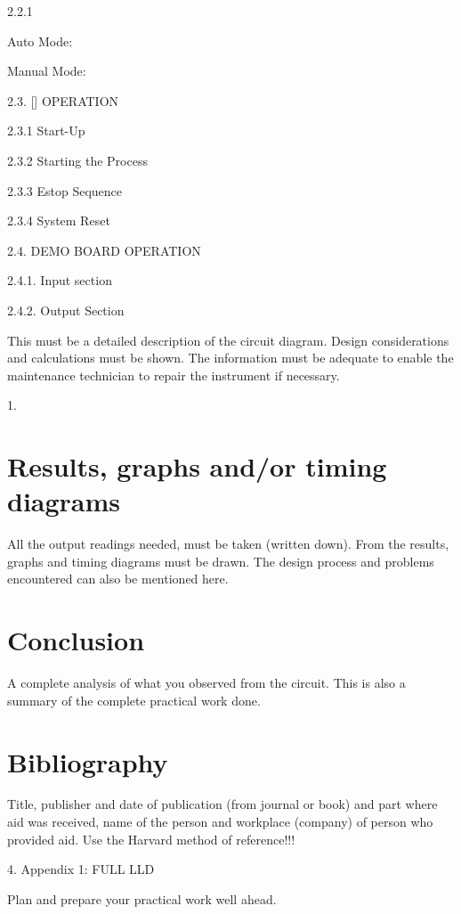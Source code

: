 \documentclass[a4,12pt]{article}
\begin{document}
            2.2.1 


Auto Mode: 

Manual Mode: 


        2.3.  [] OPERATION

            2.3.1 Start-Up

            2.3.2 Starting the Process

            2.3.3 Estop Sequence


            2.3.4 System Reset



       2.4. DEMO BOARD OPERATION

            2.4.1. Input section 

            2.4.2. Output Section

This must be a detailed description of the circuit diagram. Design considerations and calculations must be shown. The information must be adequate to enable the maintenance technician to repair the instrument if necessary.





        1. 
\section{Results, graphs and/or timing diagrams}        


All the output readings needed, must be taken (written down). From the results, graphs and timing diagrams must be drawn.
The design process and problems encountered can also be mentioned here.

        

\section{Conclusion}

A complete analysis of what you observed from the circuit. This is also a summary of the complete practical work done.

\section{Bibliography}

Title, publisher and date of publication (from journal or book) and part where aid was received, name of the person and workplace (company) of person who provided aid.
Use the Harvard method of reference!!!


        4. Appendix 1: FULL LLD


Plan and prepare your practical work well ahead. 
\end{document}
